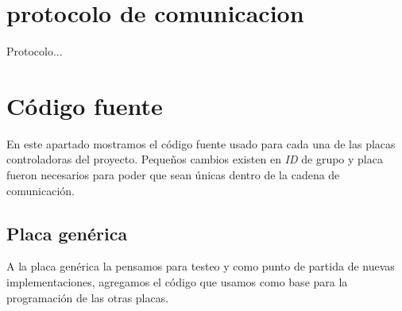 
\section{protocolo de comunicacion}
\label{hA_protocolo}

Protocolo...

\newpage

\section{C\'odigo fuente}
\label{hA_source}

En este apartado mostramos el c\'odigo fuente usado para cada una de las placas controladoras
del proyecto.
Peque\~nos cambios existen en \emph{ID} de grupo y placa fueron necesarios para poder que sean
\'unicas dentro de la cadena de comunicaci\'on.

\subsection{Placa gen\'erica}
\label{hA_source_gen}

A la placa gen\'erica la pensamos para testeo y como punto de partida de nuevas
implementaciones, agregamos el c\'odigo que usamos como base para la programaci\'on de las otras
placas.

